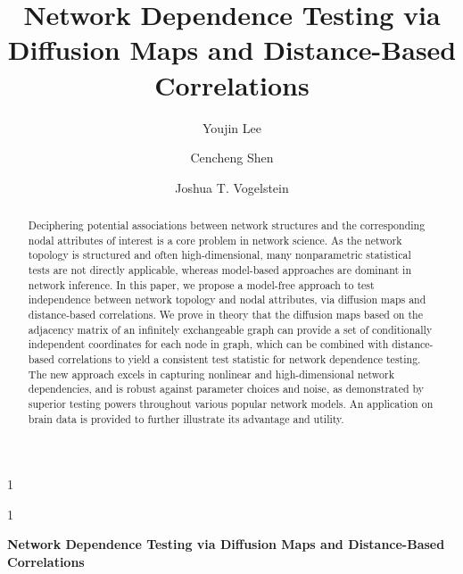 \documentclass[11pt]{article}
\theoremstyle{definition}
\newcommand{\blind}{1}
\begin{document}
\def\spacingset#1{\renewcommand{\baselinestretch}%
{#1}\small\normalsize} \spacingset{1}

\title{\bf Network Dependence Testing via Diffusion Maps and Distance-Based Correlations}
\blind
{\author[1]{Youjin Lee} %
	\author[2]{Cencheng Shen} %
	\author[2,3,4]{Joshua T. Vogelstein}
  \date{}
	\maketitle
} \fi

	\blind
	{
		\bigskip
		\bigskip
		\bigskip
		\begin{center}
			{\LARGE\bf Network Dependence Testing via Diffusion Maps and Distance-Based Correlations}
		\end{center}
		\medskip
	} \fi

\begin{abstract}
Deciphering potential associations between network structures and the corresponding nodal attributes of interest is a core problem in network science. As the network topology is structured and often high-dimensional, many nonparametric statistical tests are not directly applicable, whereas model-based approaches are dominant in network inference. In this paper, we propose a model-free approach to test independence between network topology and nodal attributes, via diffusion maps and distance-based correlations. We prove in theory that the diffusion maps based on the adjacency matrix of an infinitely exchangeable graph can provide a set of conditionally independent coordinates for each node in graph, which can be combined with distance-based correlations to yield a consistent test statistic for network dependence testing. The new approach excels in capturing nonlinear and high-dimensional network dependencies, and is robust against parameter choices and noise, as demonstrated by superior testing powers throughout various popular network models. An application on brain data is provided to further illustrate its advantage and utility.
\end{abstract}
\end{document}
